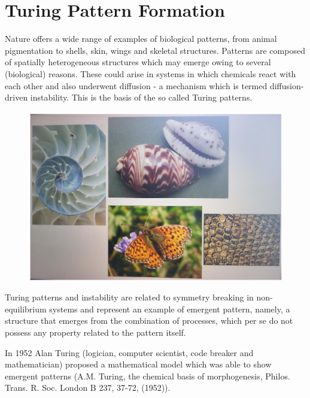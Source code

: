 
\section{Turing Pattern Formation}

Nature offers a wide range of examples of biological patterns, from animal
pigmentation to shells, skin, wings and skeletal structures. Patterns are
composed of spatially heterogeneous structures which may emerge owing to several
(biological) reasons. These could arise in systems in which chemicals react
with each other and also underwent diffusion - a mechanism which is termed
diffusion-driven instability. This is the basis of the so called Turing
patterns.
\begin{figure}[H]
  \centering
  \includegraphics[width=\textwidth]{graphics/2025_10_17_3cf351a4349ae3691080g-01}
\end{figure}

Turing patterns and instability are related to symmetry breaking in
non-equilibrium systems and represent an example of emergent pattern, namely, a
structure that emerges from the combination of processes, which per se do not
possess any property related to the pattern itself.

In 1952 Alan Turing (logician, computer scientist, code breaker and
mathematician) proposed a mathematical model which was able to show emergent
patterns (A.M. Turing, the chemical basis of morphogenesis, Philos. Trans. R.
Soc. London B 237, 37-72, (1952)).

